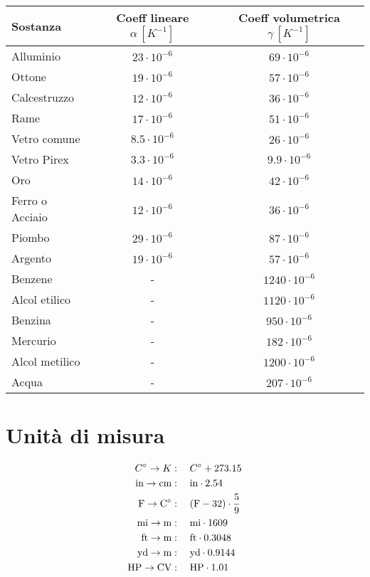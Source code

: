 \documentclass{article}
\newcommand{\cel}{C\degree}
\begin{document}
\begin{tabular}{ l | c | c }
    \hline
    \textbf{Sostanza} & \textbf{Coeff lineare \(\alpha\,[K^{-1}]\)} & \textbf{Coeff volumetrica \(\gamma\,[K^{-1}]\)} \\
    \hline
    Alluminio & \(23 \cdot 10^{-6}\) & \(69 \cdot 10^{-6}\) \\
    Ottone & \(19 \cdot 10^{-6}\) & \(57 \cdot 10^{-6}\) \\
    Calcestruzzo & \(12 \cdot 10^{-6}\) & \(36 \cdot 10^{-6}\) \\
    Rame & \(17 \cdot 10^{-6}\) & \(51 \cdot 10^{-6}\) \\
    Vetro comune & 8.\(5 \cdot 10^{-6}\) & \(26 \cdot 10^{-6}\) \\
    Vetro Pirex & 3.\(3 \cdot 10^{-6}\) & 9.\(9 \cdot 10^{-6}\) \\
    Oro & \(14 \cdot 10^{-6}\) & \(42 \cdot 10^{-6}\) \\
    Ferro o Acciaio & \(12 \cdot 10^{-6}\) & \(36 \cdot 10^{-6}\) \\
    Piombo & \(29 \cdot 10^{-6}\) & \(87 \cdot 10^{-6}\) \\
    Argento & \(19 \cdot 10^{-6}\) & \(57 \cdot 10^{-6}\) \\
    Benzene & - & \(1240 \cdot 10^{-6}\) \\
    Alcol etilico & - & \(1120 \cdot 10^{-6}\) \\
    Benzina & - & \(950 \cdot 10^{-6}\) \\
    Mercurio & - & \(182 \cdot 10^{-6}\) \\
    Alcol metilico & - & \(1200 \cdot 10^{-6}\) \\
    Acqua & - & \(207 \cdot 10^{-6}\) \\
    \hline  
\end{tabular}

\section{Unità di misura}

\begin{align*}
    \cel \to K&: \quad \cel+273.15 \\
    \text{in} \to \text{cm}&: \quad \text{in} \cdot 2.54 \\
    \text{F} \to \text{\cel}&: \quad (\text{F} - 32) \cdot \frac{5}{9} \\
    \text{mi} \to \text{m}&: \quad \text{mi} \cdot 1609 \\
    \text{ft} \to \text{m}&: \quad \text{ft} \cdot 0.3048 \\
    \text{yd} \to \text{m}&: \quad \text{yd} \cdot 0.9144 \\
    \text{HP} \to \text{CV}&: \quad \text{HP} \cdot 1.01 \\
\end{align*}
\end{document}
